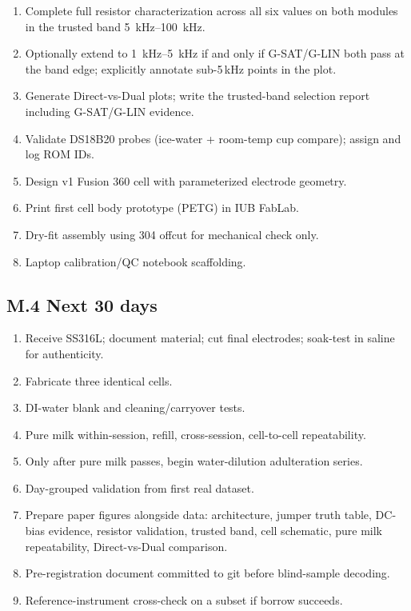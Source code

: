 \documentclass[11pt,a4paper]{article}
\begin{document}
\begin{enumerate}
\item Complete full resistor characterization across all six values on both modules in the trusted band \SIrange{5}{100}{\kilo\hertz}.
\item Optionally extend to \SIrange{1}{5}{\kilo\hertz} if and only if G-SAT/G-LIN both pass at the band edge; explicitly annotate sub-5\,kHz points in the plot.
\item Generate Direct-vs-Dual plots; write the trusted-band selection report including G-SAT/G-LIN evidence.
\item Validate DS18B20 probes (ice-water + room-temp cup compare); assign and log ROM IDs.
\item Design v1 Fusion 360 cell with parameterized electrode geometry.
\item Print first cell body prototype (PETG) in IUB FabLab.
\item Dry-fit assembly using 304 offcut for mechanical check only.
\item Laptop calibration/QC notebook scaffolding.
\end{enumerate}

\subsection{M.4 Next 30 days}

\begin{enumerate}
\item Receive SS316L; document material; cut final electrodes; soak-test in saline for authenticity.
\item Fabricate three identical cells.
\item DI-water blank and cleaning/carryover tests.
\item Pure milk within-session, refill, cross-session, cell-to-cell repeatability.
\item Only after pure milk passes, begin water-dilution adulteration series.
\item Day-grouped validation from first real dataset.
\item Prepare paper figures alongside data: architecture, jumper truth table, DC-bias evidence, resistor validation, trusted band, cell schematic, pure milk repeatability, Direct-vs-Dual comparison.
\item Pre-registration document committed to git before blind-sample decoding.
\item Reference-instrument cross-check on a subset if borrow succeeds.
\end{enumerate}
\end{document}
